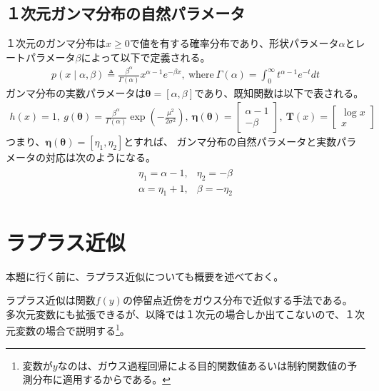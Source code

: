 \documentclass[oneside,onecolumn]{jlreq}
\theoremstyle{plain}
\begin{document}
\subsection{１次元ガンマ分布の自然パラメータ}
１次元のガンマ分布は$x\geq 0$で値を有する確率分布であり、形状パラメータ$\alpha$とレートパラメータ$\beta$によって以下で定義される。
\begin{align}
    p\left(x\mid \alpha, \beta\right) \triangleq \frac{\beta^{\alpha}}{\Gamma\left(\alpha\right)}x^{\alpha-1}e^{-\beta x},~\textrm{where}~\Gamma\left(\alpha\right) = \int_{0}^{\infty}t^{\alpha-1}e^{-t}dt
\end{align}
ガンマ分布の実数パラメータは$\bm{\theta} = \left[\alpha, \beta\right]$であり、既知関数は以下で表される。
\begin{align}
    h\left(x\right) = 1,
    ~g\left(\bm{\theta}\right) = \frac{\beta^{\alpha}}{\Gamma\left(\alpha\right)}\exp\left(-\frac{\mu^2}{2\sigma^2}\right),
    ~\bm{\eta}\left(\bm{\theta}\right) =
    \begin{bmatrix}
        \alpha-1 \\
        -\beta
    \end{bmatrix},
    ~\bm{T}\left(x\right) =
    \begin{bmatrix}
        \log x \\
        x
    \end{bmatrix}
\end{align}
つまり、$\bm{\eta}\left(\bm{\theta}\right)=\left[\eta_1, \eta_2\right]$とすれば、
ガンマ分布の自然パラメータと実数パラメータの対応は次のようになる。
\begin{align}
    \begin{matrix}
        \eta_1 = \alpha - 1, & \eta_2 = -\beta \\
        \alpha = \eta_1 + 1, & \beta = -\eta_2
    \end{matrix}
\end{align}

\newpage
\section{ラプラス近似}
本題に行く前に、ラプラス近似についても概要を述べておく。

ラプラス近似は関数$f\left(y\right)$の停留点近傍をガウス分布で近似する手法である。
多次元変数にも拡張できるが、以降では１次元の場合しか出てこないので、１次元変数の場合で説明する\footnote{変数が$y$なのは、ガウス過程回帰による目的関数値あるいは制約関数値の予測分布に適用するからである。}。
\end{document}
